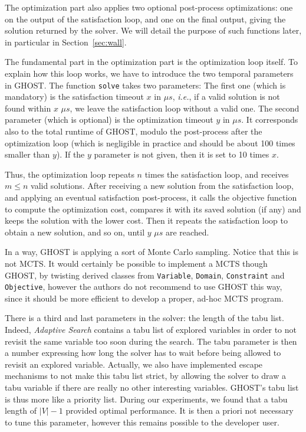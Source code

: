 \documentclass[journal]{IEEEtran}
\newcommand{\ghost}{\textsc{GHOST}\xspace}
\newcommand{\ie}{\textit{i.e.}}
\begin{document}
The  optimization   part  also   applies  two   optional  post-process
optimizations: one on the output of  the satisfaction loop, and one on the
final output,  giving the  solution returned by  the solver.   We will
detail  the  purpose  of  such   functions  later,  in  particular  in
Section~\ref{sec:wall}.

The fundamental part in the optimization part is the optimization
loop itself. To explain how this loop works, we have to introduce the
two temporal parameters in \ghost. The function \texttt{solve} takes
two parameters: The first one (which is mandatory) is the satisfaction timeout
$x$ in $\mu s$, 
\ie, if a valid solution is not found within $x$ $\mu s$, we leave the satisfaction loop without a valid one.
The second parameter (which is optional) 
is the optimization timeout $y$ in $\mu s$. It
corresponds also to the total runtime of \ghost, modulo the
post-process after the optimization loop (which is negligible in
practice and should be about 100 times smaller than $y$). If the $y$
parameter is not given, then it is set to 10 times $x$.

Thus, the optimization  loop repeats $n$ times  the satisfaction loop,
and receives  $m \leq  n$ valid solutions. After  receiving a
new  solution from  the satisfaction  loop, and  applying an  eventual
satisfaction post-process, it calls  the objective function to compute
the optimization  cost, compares it  with its saved solution  (if any)
and  keeps the  solution with  the lower  cost.  Then  it repeats  the
satisfaction loop  to obtain a new  solution, and so on,  until $y$ $\mu s$
are reached.

In a way, \ghost is applying a sort of Monte Carlo sampling. Notice
that this  is not MCTS.   It would  certainly be possible to  implement a
MCTS    though   \ghost,    by   twisting    derived   classes    from
\texttt{Variable},     \texttt{Domain},    \texttt{Constraint}     and
\texttt{Objective}, however the authors do not recommend to use \ghost
this  way, since  it should  be more  efficient to  develop a  proper,
ad-hoc MCTS program.

There is a third and last  parameters in the solver: the length of
the tabu list.  Indeed, {\it Adaptive  Search} contains a tabu list of
explored variables in order to not  revisit the same variable too soon
during the search. The tabu parameter  is then a number expressing how
long  the solver  has  to  wait before  being  allowed  to revisit  an
explored variable. Actually, we  also have implemented escape mechanisms
to not make  this tabu list strict,  by allowing the solver  to draw a
tabu   variable   if   there   are   really   no   other   interesting
variables. \ghost's tabu list is thus more like a priority list.
% 
% 
During  our experiments,  we found that a tabu length of $|V|-1$ provided optimal performance.
It is then a priori not necessary to tune this parameter, however this
remains possible to the developer user.
\end{document}
